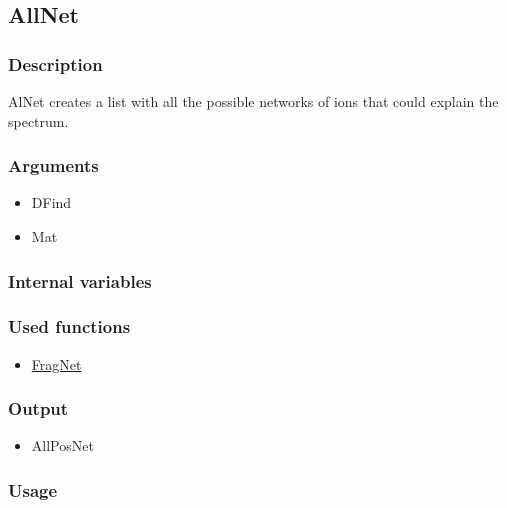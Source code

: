 \subsection{AllNet}
\subsubsection{Description}
AlNet creates a list with all the possible networks of ions that could explain the spectrum.
\subsubsection{Arguments}
\begin{itemize}
\item DFind
\item Mat
\end{itemize}
\subsubsection{Internal variables}
\subsubsection{Used functions}
\begin{itemize}
\item \hyperref[FragNet]{FragNet}
\end{itemize}
\subsubsection{Output}
\begin{itemize}
\item AllPosNet
\end{itemize}
\subsubsection{Usage}




